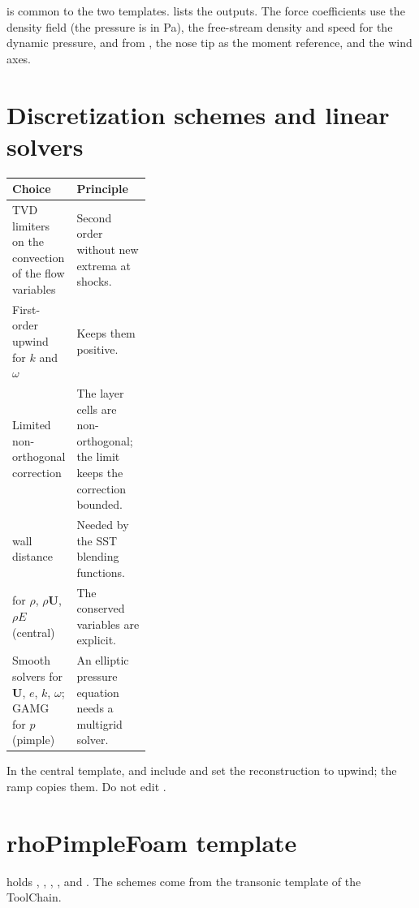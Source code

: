  is common to the two templates.  lists
the outputs. The force coefficients use the density field (the pressure is in Pa), the
free-stream density and speed for the dynamic pressure,  and  from
, the nose tip as the moment reference, and the wind axes.

\section{Discretization schemes and linear solvers}\label{sec:schemes}

\begin{tabularx}{\linewidth}{@{}P{0.34\linewidth} L@{}}
\toprule
Choice & Principle \\
\midrule
TVD limiters on the convection of the flow variables & Second order without new extrema at shocks. \\
First-order upwind for $k$ and $\omega$ & Keeps them positive. \\
Limited non-orthogonal correction & The layer cells are non-orthogonal; the limit keeps the correction bounded. \\
 wall distance & Needed by the SST blending functions. \\
 for $\rho$, $\rho\mathbf{U}$, $\rho E$ (central) & The conserved variables are explicit. \\
Smooth solvers for $\mathbf{U}$, $e$, $k$, $\omega$; GAMG for $p$ (pimple) & An elliptic pressure equation needs a multigrid solver. \\
\bottomrule
\end{tabularx}

\medskip
In the central template,  and  include
 and set the reconstruction to upwind; the ramp copies them.
Do not edit .

\section{rhoPimpleFoam template}\label{sec:pimple}

 holds , ,
, ,  and .
The schemes come from the transonic template of the ToolChain.

